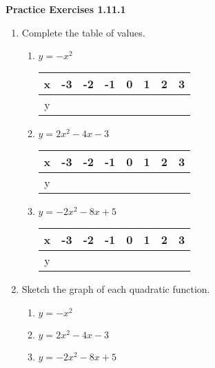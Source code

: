 \vspace{1ex}
\noindent\textbf{Practice Exercises 1.11.1}

\vspace{0.75ex}

\begin{enumerate}[label = \color{blue}\Alph*. ]
\item Complete the table of values. 
\begin{enumerate}[label = \color{blue}\arabic*. ]
\item $y = -x^{2}$

\begin{tabular}{|*8{c|}} 
\hline 
x & -3 & -2 & -1 & 0 & 1 & 2 & 3 \\
\hline 
y & & & & & & & \\
\hline 
\end{tabular}
\item $ y = 2x^{2} - 4x - 3 $

\begin{tabular}{|*8{c|}} 
\hline 
x & -3 & -2 & -1 & 0 & 1 & 2 & 3 \\
\hline 
y & & & & & & & \\
\hline 
\end{tabular}
\item $ y = -2x^{2} - 8x + 5 $

\begin{tabular}{|*8{c|}} 
\hline 
x & -3 & -2 & -1 & 0 & 1 & 2 & 3 \\
\hline 
y & & & & & & & \\
\hline 
\end{tabular}

\end{enumerate}

\item Sketch the graph of each quadratic function. 
\begin{enumerate}[label = \color{blue}\arabic*. ]
\item $y = -x^{2}$
\item $ y = 2x^{2} - 4x - 3 $
\item $ y = -2x^{2} - 8x + 5 $
\end{enumerate}

\end{enumerate}
